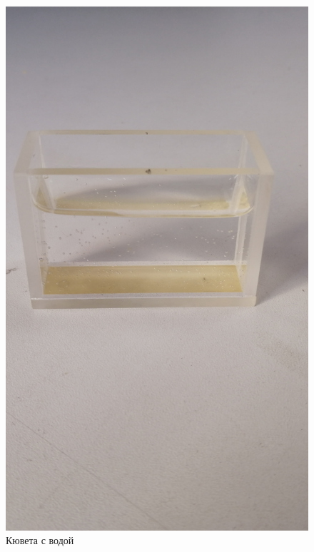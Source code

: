 \documentclass{beamer}
\begin{document}
\begin{frame}
\begin{columns}
\begin{figure}
				\includegraphics[width=\linewidth]{res/water_cuvette.png}
				\caption*{Кювета с водой}
			\end{figure}
		\end{columns}
	\end{frame}	
\end{document}
